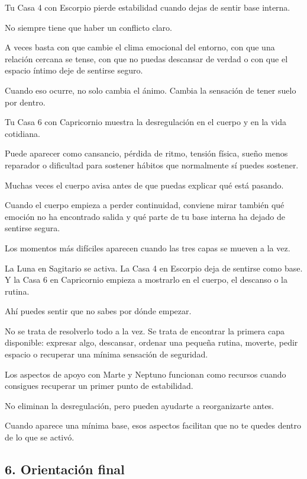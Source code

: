 \documentclass[11pt,a4paper]{article}
\begin{document}
Tu Casa 4 con Escorpio pierde estabilidad cuando dejas de sentir base interna.

No siempre tiene que haber un conflicto claro.

A veces basta con que cambie el clima emocional del entorno, con que una relación cercana se tense, con que no puedas descansar de verdad o con que el espacio íntimo deje de sentirse seguro.

Cuando eso ocurre, no solo cambia el ánimo. Cambia la sensación de tener suelo por dentro.

Tu Casa 6 con Capricornio muestra la desregulación en el cuerpo y en la vida cotidiana.

Puede aparecer como cansancio, pérdida de ritmo, tensión física, sueño menos reparador o dificultad para sostener hábitos que normalmente sí puedes sostener.

Muchas veces el cuerpo avisa antes de que puedas explicar qué está pasando.

Cuando el cuerpo empieza a perder continuidad, conviene mirar también qué emoción no ha encontrado salida y qué parte de tu base interna ha dejado de sentirse segura.

Los momentos más difíciles aparecen cuando las tres capas se mueven a la vez.

La Luna en Sagitario se activa.
La Casa 4 en Escorpio deja de sentirse como base.
Y la Casa 6 en Capricornio empieza a mostrarlo en el cuerpo, el descanso o la rutina.

Ahí puedes sentir que no sabes por dónde empezar.

No se trata de resolverlo todo a la vez.
Se trata de encontrar la primera capa disponible: expresar algo, descansar, ordenar una pequeña rutina, moverte, pedir espacio o recuperar una mínima sensación de seguridad.

Los aspectos de apoyo con Marte y Neptuno funcionan como recursos cuando consigues recuperar un primer punto de estabilidad.

No eliminan la desregulación, pero pueden ayudarte a reorganizarte antes.

Cuando aparece una mínima base, esos aspectos facilitan que no te quedes dentro de lo que se activó.

\subsection{6. Orientación final}
\end{document}
